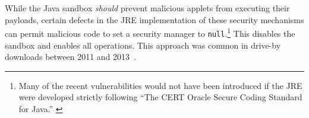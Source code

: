 \documentclass{sig-alternate}
\begin{document}

%
While the Java sandbox \textit{should} prevent malicious applets from
executing their payloads, certain defects in the JRE implementation of these security mechanisms can permit
malicious code to set a security manager to \texttt{null}.\footnote{Many of the recent vulnerabilities
would not have been introduced if the JRE were developed strictly
following ``The CERT Oracle Secure Coding Standard for Java.'' \cite{long_cert_2011,svoboda_anatomy_blog_2013,svoboda_anatomy_2014}}  
This disables the sandbox and enables all operations. 
This approach was common in drive-by downloads between 2011 and 2013~\cite{fireeye_2013}. 
%
\end{document}
